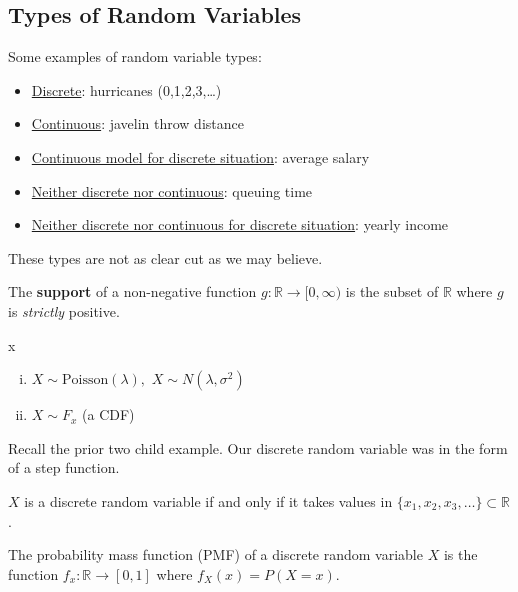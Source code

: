 
\subsection{Types of Random Variables}
Some examples of random variable types:
\begin{itemize}
		\item \underline{Discrete}: hurricanes (0,1,2,3,\ldots)
		\item \underline{Continuous}: javelin throw distance
		\item \underline{Continuous model for discrete situation}: average salary
		\item \underline{Neither discrete nor continuous}: queuing time
		\item \underline{Neither discrete nor continuous for discrete situation}: yearly income
\end{itemize}
These types are not as clear cut as we may believe. 

\begin{definition}
The \textbf{support} of a non-negative function $g:\mathbb R\to [0,\infty)$ is the subset of $\mathbb R$ where $g$ is \textit{strictly} positive.
\end{definition}

\begin{notation}
\phantom x
\begin{enumerate}[(i)]
    \item $X\sim \text{Poisson}(\lambda),$ $X\sim N(\lambda,\sigma^2)$
    \item $X\sim F_x$ (a CDF)
\end{enumerate}
\end{notation}

\begin{eg}
	Recall the prior two child example. Our discrete random variable was in the form of a step function.
\end{eg}

\begin{definition}
$X$ is a discrete random variable if and only if it takes values in $\{x_1,x_2,x_3,\dots\}\subset \mathbb R$.
\end{definition}

\begin{definition}
The probability mass function (PMF) of a discrete random variable $X$ is the function $f_x:\mathbb R\to [0,1]$ where $f_X(x)=P(X=x)$.
\end{definition}

